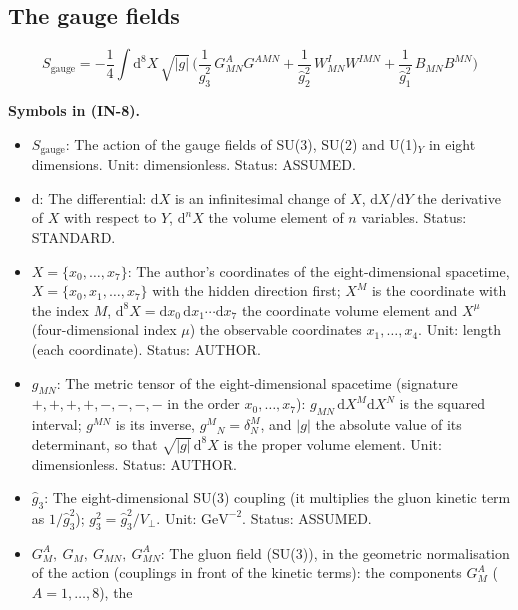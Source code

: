 \documentclass[
  10pt,
]{article}
\providecommand{\tightlist}{%
  \setlength{\itemsep}{0pt}\setlength{\parskip}{0pt}}
\begin{document}
\hypertarget{the-gauge-fields}{%
\subsection{The gauge fields}\label{the-gauge-fields}}

\[
S_{\mathrm{gauge}} = -\frac14\int\mathrm{d}^8X\,\sqrt{\lvert g\rvert}\,\Big(\frac{1}{\hat
 g_3^2}\,G^A_{MN}G^{AMN}
 + \frac{1}{\hat g_2^2}\,W^I_{MN}W^{IMN} + \frac{1}{\hat g_1^2}\,B_{MN}B^{MN}\Big) \tag{IN-8}
\]

\textbf{Symbols in (IN-8).}

\begin{itemize}
\tightlist
\item
  \(S_{\mathrm{gauge}}\): The action of the gauge fields of SU(3), SU(2)
  and U(1)\(_Y\) in eight dimensions. Unit: dimensionless. Status:
  ASSUMED.
\item
  \(\mathrm{d}\): The differential: \(\mathrm{d}X\) is an infinitesimal
  change of \(X\), \(\mathrm{d}X/\mathrm{d}Y\) the derivative of \(X\)
  with respect to \(Y\), \(\mathrm{d}^nX\) the volume element of \(n\)
  variables. Status: STANDARD.
\item
  \(X = \{x_0, \dots, x_7\}\): The author's coordinates of the
  eight-dimensional spacetime, \(X = \{x_0, x_1, \dots, x_7\}\) with the
  hidden direction first; \(X^M\) is the coordinate with the index
  \(M\),
  \(\mathrm{d}^8X = \mathrm{d}x_0\,\mathrm{d}x_1\cdots\mathrm{d}x_7\)
  the coordinate volume element and \(X^\mu\) (four-dimensional index
  \(\mu\)) the observable coordinates \(x_1, \dots, x_4\). Unit: length
  (each coordinate). Status: AUTHOR.
\item
  \(g_{MN}\): The metric tensor of the eight-dimensional spacetime
  (signature \(+,+,+,+,-,-,-,-\) in the order \(x_0, \dots, x_7\)):
  \(g_{MN}\,\mathrm{d}X^M\mathrm{d}X^N\) is the squared interval;
  \(g^{MN}\) is its inverse, \(g^M{}_N = \delta^M_N\), and
  \(\lvert g\rvert\) the absolute value of its determinant, so that
  \(\sqrt{\lvert g\rvert}\,\mathrm{d}^8X\) is the proper volume element.
  Unit: dimensionless. Status: AUTHOR.
\item
  \(\hat g_3\): The eight-dimensional SU(3) coupling (it multiplies the
  gluon kinetic term as \(1/\hat g_3^2\));
  \(g_3^2 = \hat g_3^2/V_\perp\). Unit: \(\mathrm{GeV}^{-2}\). Status:
  ASSUMED.
\item
  \(G^A_M,\ G_M,\ G_{MN},\ G^A_{MN}\): The gluon field (SU(3)), in the
  geometric normalisation of the action (couplings in front of the
  kinetic terms): the components \(G^A_M\) (\(A = 1, \dots, 8\)), the

\end{itemize}
\end{document}
